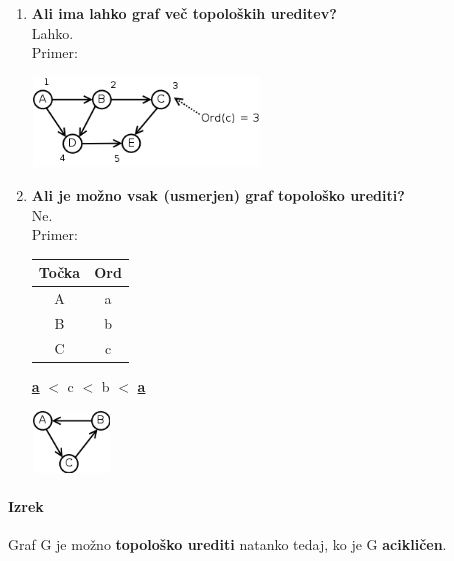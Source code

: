 \documentclass[a4paper,10pt]{article}
\begin{document}
\begin{enumerate}
\item \textbf{Ali ima lahko graf ve\v c topolo\v skih ureditev?} \\
	Lahko. \\
	Primer: 
	\begin{center}
	\includegraphics[width=6.05cm,height=2.4cm]{Slike/NajcenejsePoti5.png}
	\end{center}

\item \textbf{Ali je mo\v zno vsak (usmerjen) graf topolo\v sko urediti?} \\
	Ne. \\
	Primer:
	\begin{center}
	\begin{tabular}{c|c}\hline
	To\v cka	& Ord	\\\hline
	A	& a	\\
	B	& b	\\
	C	& c
	\end{tabular}
	\textbf{\underline{a}} $<$ c $<$ b $<$ \textbf{\underline{a}}
	\end{center}
	\begin{center}
	\includegraphics[width=2.1cm,height=1.65cm]{Slike/NajcenejsePoti6.png}
	\end{center}

\end{enumerate}

\paragraph{Izrek}
Graf G je mo\v zno \textbf{topolo\v sko urediti} natanko tedaj, ko je G \textbf{acikli\v cen}.
\end{document}

